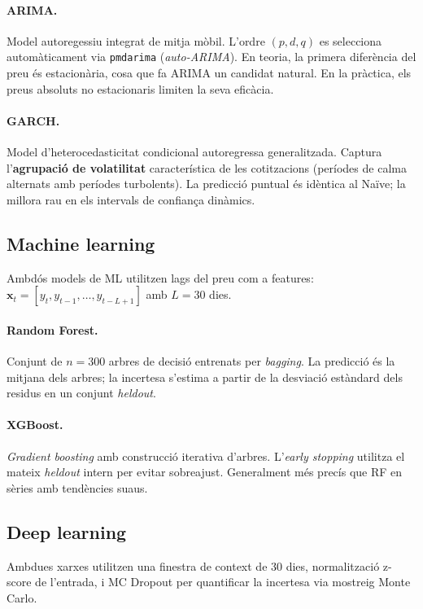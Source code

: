 \documentclass[12pt,a4paper]{article}
\begin{document}
\paragraph{ARIMA.} Model autoregessiu integrat de mitja mòbil. L'ordre $(p,d,q)$ es
selecciona automàticament via \texttt{pmdarima} (\textit{auto-ARIMA}). En teoria, la
primera diferència del preu és estacionària, cosa que fa ARIMA un candidat natural.
En la pràctica, els preus absoluts no estacionaris limiten la seva eficàcia.

\paragraph{GARCH.} Model d'heterocedasticitat condicional autoregressa generalitzada.
Captura l'\textbf{agrupació de volatilitat} característica de les cotitzacions
(períodes de calma alternats amb períodes turbolents). La predicció puntual és idèntica
al Naïve; la millora rau en els intervals de confiança dinàmics.

\subsection{Machine learning}

Ambdós models de ML utilitzen lags del preu com a features:
$\mathbf{x}_t = [y_t, y_{t-1}, \ldots, y_{t-L+1}]$ amb $L = 30$ dies.

\paragraph{Random Forest.} Conjunt de $n=300$ arbres de decisió entrenats per
\textit{bagging}. La predicció és la mitjana dels arbres; la incertesa s'estima
a partir de la desviació estàndard dels residus en un conjunt \textit{heldout}.

\paragraph{XGBoost.} \textit{Gradient boosting} amb construcció iterativa d'arbres.
L'\textit{early stopping} utilitza el mateix \textit{heldout} intern per evitar
sobreajust. Generalment més precís que RF en sèries amb tendències suaus.

\subsection{Deep learning}

Ambdues xarxes utilitzen una finestra de context de 30 dies, normalització z-score
de l'entrada, i MC Dropout per quantificar la incertesa via mostreig Monte Carlo.
\end{document}
